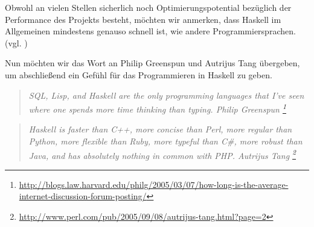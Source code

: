 Obwohl an vielen Stellen sicherlich noch Optimierungspotential bezüglich der
Performance des Projekts besteht, möchten wir anmerken, dass Haskell im
Allgemeinen mindestens genauso schnell ist, wie andere Programmiersprachen.
(vgl. \autocite{haskellwiki:performance}) 

Nun möchten wir das Wort an 
Philip Greenspun und Autrijus Tang übergeben, um abschließend ein Gefühl für das
Programmieren in Haskell zu geben.

\begin{quote}
  \itshape SQL, Lisp, and Haskell are the only programming languages that 
  I've seen where one spends more time thinking than typing.
  \hfill\normalfont\sffamily\small Philip Greenspun%
  \footnote{%
  \url{http://blogs.law.harvard.edu/philg/2005/03/07/how-long-is-the-average-internet-discussion-forum-posting/}}
\end{quote}

\begin{quote}
  \itshape 
  Haskell is faster than C++, more concise than Perl, more regular than Python,
  more flexible than Ruby, more typeful than C\#, more robust than Java, and 
  has absolutely nothing in common with PHP.
  \hfill\normalfont\sffamily\small Autrijus Tang%
  \footnote{\url{http://www.perl.com/pub/2005/09/08/autrijus-tang.html?page=2}}
\end{quote}
